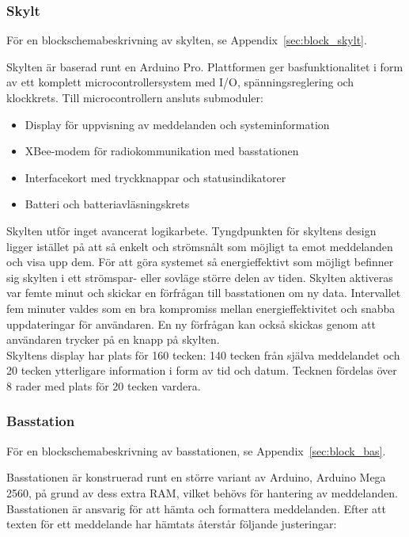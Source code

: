 \documentclass[a4paper,11pt]{article}
\begin{document}
\subsubsection{Skylt}
För en blockschemabeskrivning av skylten, se Appendix~\ref{sec:block_skylt}.

Skylten är baserad runt en Arduino Pro. Plattformen ger basfunktionalitet i form av ett komplett microcontrollersystem med I/O, spänningsreglering och klockkrets. Till microcontrollern ansluts submoduler:
	
	\begin{itemize}
    	\item Display för uppvisning av meddelanden och systeminformation
    	\item XBee-modem för radiokommunikation med basstationen
    	\item Interfacekort med tryckknappar och statusindikatorer
    	\item Batteri och batteriavläsningskrets
	\end{itemize}
	
Skylten utför inget avancerat logikarbete. Tyngdpunkten för skyltens design ligger istället på att så enkelt och strömsnålt som möjligt ta emot meddelanden och visa upp dem. För att göra systemet så energieffektivt som möjligt befinner sig skylten i ett strömspar- eller sovläge större delen av tiden. Skylten aktiveras var femte minut och skickar en förfrågan till basstationen om ny data. Intervallet fem minuter valdes som en bra kompromiss mellan energieffektivitet och snabba uppdateringar för användaren. En ny förfrågan kan också skickas genom att användaren trycker på en knapp på skylten.\\

Skyltens display har plats för 160 tecken: 140 tecken från själva meddelandet och 20 tecken ytterligare information i form av tid och datum. Tecknen fördelas över 8 rader med plats för 20 tecken vardera.

\subsubsection{Basstation}
För en blockschemabeskrivning av basstationen, se Appendix~\ref{sec:block_bas}.

Basstationen är konstruerad runt en större variant av Arduino, Arduino Mega 2560, på grund av dess extra RAM, vilket behövs för hantering av meddelanden. Basstationen är ansvarig för att hämta och formattera meddelanden. Efter att texten för ett meddelande har hämtats återstår följande justeringar:
	
\end{document}
